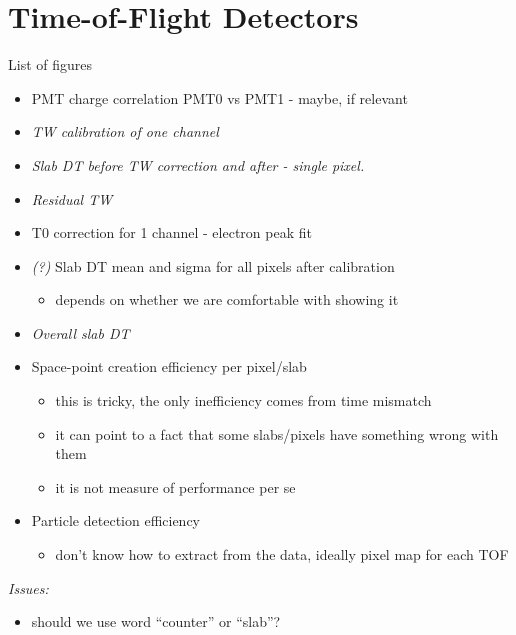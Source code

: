 \graphicspath{{02-TOF/Figures/}}


\newcommand{\mchange}[2]{{\color{red}#1}{\color{green}#2}}
\newcommand{\malert}[1]{{\it\color{red}#1}}
\newcommand{\hilite}[1]{{\it\color{blue}#1}}
\newcommand{\Tzero}{\ensuremath{T0}}

\section{Time-of-Flight Detectors}
\label{Sect:TOF}

List of figures
\begin{itemize}
\item PMT charge correlation PMT0 vs PMT1 - maybe, if relevant
\item \hilite{TW calibration of one channel}
\item \hilite{Slab DT before TW correction and after - single pixel.}
\item \hilite{Residual TW}
\item T0 correction for 1 channel - electron peak fit
\item \malert{(?)} Slab DT mean and sigma for all pixels after
  calibration
  \begin{itemize} \it
  \item depends on whether we are comfortable with showing it
  \end{itemize}
\item \hilite{Overall slab DT}
\item Space-point creation efficiency per pixel/slab
  \begin{itemize}\it
  \item this is tricky, the only inefficiency comes from time mismatch
  \item it can point to a fact that some slabs/pixels have something
    wrong with them
  \item it is not measure of performance per se
  \end{itemize}
\item Particle detection efficiency
  \begin{itemize} \it
  \item don't know how to extract from the data, ideally pixel map for
    each TOF
  \end{itemize}

\end{itemize}


\malert{Issues:}
\begin{itemize}
\item should we use word ``counter'' or ``slab''?
\end{itemize}

